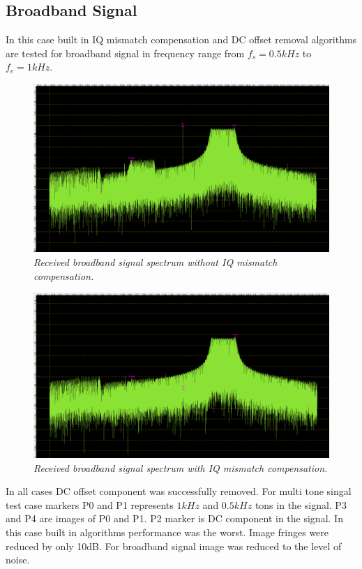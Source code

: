 \documentclass[en,printmode]{mgr}
\begin{document}
	 \subsection*{Broadband Signal}
	 	In this case built in IQ mismatch compensation and DC offset removal algorithms are
	 	tested for broadband signal in frequency range from $f_s=0.5kHz$ to $f_e=1kHz$.
   		 	\begin{figure}[H]
    			\centering
   				\includegraphics[width=\textwidth]{plots/real_band_off.png}
   		 		\caption{\textit{Received broadband signal spectrum without IQ mismatch compensation.}}
   		 	\end{figure}
   		 	\vspace{0.5cm}
   		 	\begin{figure}[H]
    			\centering
   				\includegraphics[width=\textwidth]{plots/real_band_on.png}
   		 		\caption{\textit{Received broadband signal spectrum with IQ mismatch compensation.}}
   		 	\end{figure}
   		 	\newpage
   		 	In all cases DC offset component was successfully removed.  		 	
			For multi tone singal test case markers P0 and P1 represents $1kHz$ and $0.5kHz$ 
			tons in the signal. P3 and P4 are images
   		 	of P0 and P1. P2 marker is DC component in the signal. In this case built in algorithms
   		    performance was the worst. Image fringes were reduced by only 10dB. For broadband signal
   		    image was reduced to the level of noise.
   		    
\end{document}
